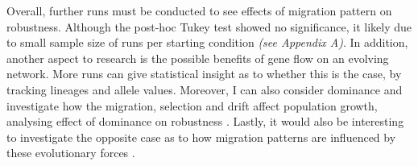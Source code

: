 Overall, further runs must be conducted to see effects of migration pattern on robustness. Although the post-hoc Tukey test showed no significance, it likely due to small sample size of runs per starting condition \textit{(see Appendix A)}. In addition, another aspect to research is the possible benefits of gene flow on an evolving network. More runs can give statistical insight as to whether this is the case, by tracking lineages and allele values. Moreover, I can also consider dominance and investigate how the migration, selection and drift affect population growth, analysing effect of dominance on robustness \cite{rice2009evolution,otto1999balanced}. Lastly, it would also be interesting to investigate the opposite case as to how migration patterns are influenced by these evolutionary forces \cite{w2004dispersal}.
